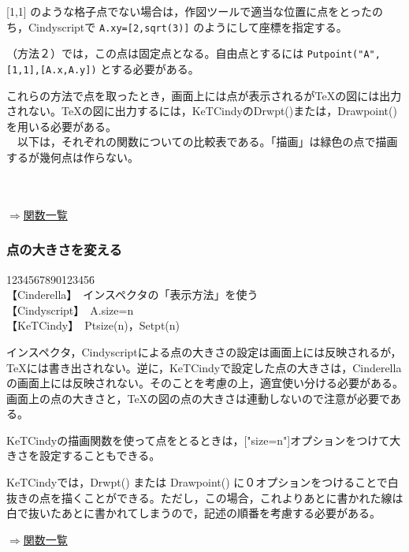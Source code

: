 \documentclass[papersize,a4paper,12pt,uplatex]{jsarticle}
\begin{document}
[1,1] のような格子点でない場合は，作図ツールで適当な位置に点をとったのち，Cindyscriptで \verb|A.xy=[2,sqrt(3)]| のようにして座標を指定する。

（方法２）では，この点は固定点となる。自由点とするには \verb|Putpoint("A",[1,1],[A.x,A.y])| とする必要がある。

これらの方法で点を取ったとき，画面上には点が表示されるがTeXの図には出力されない。TeXの図に出力するには，KeTCindyのDrwpt()または，Drawpoint()を用いる必要がある。\\

　以下は，それぞれの関数についての比較表である。「描画」は緑色の点で描画するが幾何点は作らない。\\
　\\
　　　　　
\begin{flushright} \hyperlink{functionlist3d}{$\Rightarrow$関数一覧}\end{flushright}

\subsubsection{点の大きさを変える}

\begin{tabbing}
12\=34567890123456\=\kill\\

\>【Cinderella】　\>インスペクタの「表示方法」を使う\\ 
\>【Cindyscript】　\>A.size=n\\
 \>【KeTCindy】　\>Ptsize(n)，Setpt(n)\\
\end{tabbing}

インスペクタ，Cindyscriptによる点の大きさの設定は画面上には反映されるが，TeXには書き出されない。逆に，KeTCindyで設定した点の大きさは，Cinderellaの画面上には反映されない。そのことを考慮の上，適宜使い分ける必要がある。画面上の点の大きさと，TeXの図の点の大きさは連動しないので注意が必要である。

KeTCindyの描画関数を使って点をとるときは，["size=n"]オプションをつけて大きさを設定することもできる。

KeTCindyでは，Drwpt() または Drawpoint() に０オプションをつけることで白抜きの点を描くことができる。ただし，この場合，これよりあとに書かれた線は白で抜いたあとに書かれてしまうので，記述の順番を考慮する必要がある。\\
\begin{flushright} \hyperlink{functionlist3d}{$\Rightarrow$関数一覧}\end{flushright}
\end{document}
